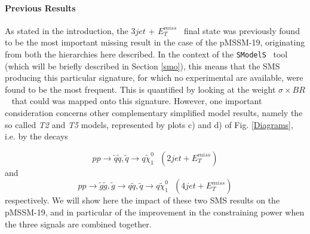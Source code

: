 \documentclass[a4paper,11pt]{article}
\newcommand{\MET}{{ $E_T ^{miss}$}}
\newcommand{\SMO}{\texttt{SModelS\xspace}}
\newcommand{\WEIGHT}{$\sigma \times BR$\xspace}
\begin{document}
\paragraph{Previous Results}
As stated in the introduction, the $3jet$ + \MET~ final state was previously found to be the most important missing result in the case of the pMSSM-19, originating from both the hierarchies here described. In the context of the \SMO~ tool (which will be briefly described in Section \ref{smo}), this means that the SMS producing this particular signature, for which no experimental are available, were found to be the most frequent. This is quantified by looking at the weight \WEIGHT~ that could was mapped onto this signature.
However, one important consideration concerns other complementary simplified model results, namely the so called \textit{T2} and \textit{T5} models, represented by plots c) and d) of Fig. \ref{Diagrams}, i.e. by the decays

\begin{equation}
p p \rightarrow \tilde q \tilde q ,\tilde q \rightarrow q \tilde \chi _1 ^0  \ \ \ (2jet + E_T^{miss})
\end{equation}
and
\begin{equation}
p p \rightarrow \tilde g \tilde g , \tilde g \rightarrow q  \tilde q , \tilde q \rightarrow q \tilde \chi _1 ^0 \ \ \ (4jet + E_T^{miss})
\end{equation}
respectively. We will show here the impact of these two SMS results on the pMSSM-19, and in particular of the improvement in the constraining power when the three signals are combined together.  
\end{document}
